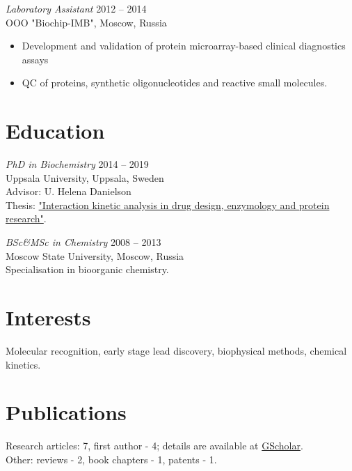 \documentclass[margin]{res}
\begin{document}
\begin{resume}
{\sl Laboratory Assistant} \hfill 2012 -- 2014 \\
OOO "Biochip-IMB", Moscow, Russia
\begin{itemize}
\setlength\itemsep{0em}
\item Development and validation of protein microarray-based clinical diagnostics assays
\item QC of proteins, synthetic oligonucleotides and reactive small molecules.
\end{itemize}
 
\section{Education} {\sl PhD in Biochemistry} \hfill 2014 -- 2019 \\
Uppsala University, Uppsala, Sweden \\
Advisor: U. Helena Danielson \\
Thesis: \href{http://uu.diva-portal.org/smash/record.jsf?pid=diva2%3A1256395&dswid=214}{"Interaction kinetic analysis in drug design, enzymology and protein research"}.

{\sl BSc\&MSc in Chemistry} \hfill 2008 -- 2013 \\
Moscow State University, Moscow, Russia \\
Specialisation in bioorganic chemistry.
                 
\section{Interests} Molecular recognition, early stage lead discovery, biophysical methods, chemical kinetics.
 

\newpage

\section{Publications}
\nocite{*}
Research articles: 7, first author - 4; details are available at \href{https://scholar.google.com/citations?hl=sv&user=H5uK2zsAAAAJ&view_op=list_works&authuser=2&sortby=pubdate}{GScholar}.\\
Other: reviews - 2, book chapters - 1, patents  - 1.\\
\printbibliography[heading=none]
\end{resume}
\end{document}
